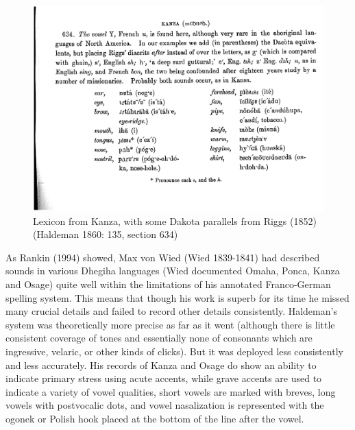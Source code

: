 \documentclass[output=paper]{LSP/langsci}
\begin{document}
\begin{figure}
\centering
\caption{Lexicon from Kanza, with some Dakota parallels from Riggs (1852)  (Haldeman 1860: 135, section 634)} \label{haldemanlexicon}
\includegraphics[width=5in]{figures/GrantKanzaWords}
\end{figure}

As Rankin (1994) showed, Max von Wied (Wied 1839-1841) had described sounds in various Dhegiha languages (Wied documented Omaha, Ponca, Kanza and Osage) quite well within the limitations of his annotated Franco-German spelling system. This means that though his work is superb for its time he missed many crucial details and failed to record other details consistently.   Haldeman's system was theoretically more precise as far as it went (although there is little consistent coverage of tones and essentially none of consonants which are ingressive, velaric, or other kinds of clicks). But it was deployed less consistently and less accurately.   His records of Kanza and Osage do show an ability to indicate primary stress using acute accents, while grave accents are used to indicate a variety of vowel qualities, short vowels are marked with breves, long vowels with postvocalic dots, and vowel nasalization is represented with the ogonek or Polish hook placed at the bottom of the line after the vowel.  
\end{document}
